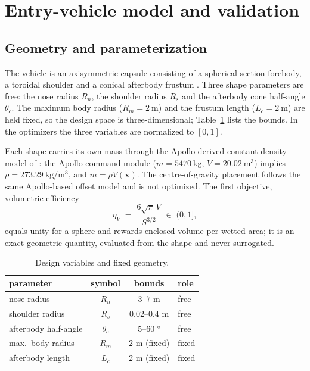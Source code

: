 \section{Entry-vehicle model and validation}
\label{sec:model}

\subsection{Geometry and parameterization}
\label{sec:geometry}

The vehicle is an axisymmetric capsule consisting of a spherical-section
forebody, a toroidal shoulder and a conical afterbody frustum
\cite{dirkx2017entry}. Three shape parameters are free: the nose radius
$R_n$, the shoulder radius $R_s$ and the afterbody cone half-angle
$\theta_c$. The maximum body radius ($R_m=\SI{2}{\metre}$) and the frustum
length ($L_c=\SI{2}{\metre}$) are held fixed, so the design space is
three-dimensional; Table~\ref{tab:bounds} lists the bounds. In the
optimizers the three variables are normalized to $[0,1]$.

Each shape carries its own mass through the Apollo-derived
constant-density model of \cite{dirkx2017entry}: the Apollo command module
($m=\SI{5470}{\kilogram}$, $V=\SI{20.02}{\cubic\metre}$) implies
$\rho=\SI{273.29}{\kilogram\per\cubic\metre}$, and $m=\rho V(\mathbf{x})$.
The centre-of-gravity placement follows the same Apollo-based offset model
and is not optimized. The first objective, volumetric efficiency
\begin{equation}
\eta_V \;=\; \frac{6\sqrt{\pi}\,V}{S^{3/2}} \;\in\; (0,1],
\label{eq:etav}
\end{equation}
equals unity for a sphere and rewards enclosed volume per wetted area; it
is an exact geometric quantity, evaluated from the shape and never
surrogated.

\begin{table}[htbp]
\centering
\caption{Design variables and fixed geometry.}
\label{tab:bounds}
\begin{tabular}{lccl}
\toprule
parameter & symbol & bounds & role \\
\midrule
nose radius            & $R_n$    & $3$--$7$ \si{\metre}          & free \\
shoulder radius        & $R_s$    & $0.02$--$0.4$ \si{\metre}     & free \\
afterbody half-angle   & $\theta_c$ & $5$--$60$ \si{\degree}      & free \\
max.\ body radius      & $R_m$    & $2$ \si{\metre} (fixed)       & fixed \\
afterbody length       & $L_c$    & $2$ \si{\metre} (fixed)       & fixed \\
\bottomrule
\end{tabular}
\end{table}

